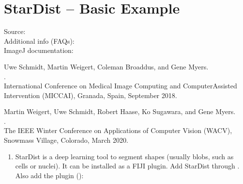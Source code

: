 \documentclass[letterpaper,10pt,english]{jupyterBook}
\begin{document}
\sphinxAtStartPar
{}

\sphinxstepscope


\chapter{StarDist – Basic Example}
\label{\detokenize{stardist:stardist-basic-example}}\label{\detokenize{stardist::doc}}
\sphinxAtStartPar
Source: \\
Additional info (FAQs): \\
ImageJ documentation: 

\sphinxAtStartPar
Uwe Schmidt, Martin Weigert, Coleman Broaddus, and Gene Myers.\\
.\\
International Conference on Medical Image Computing and Computer\sphinxhyphen{}Assisted Intervention (MICCAI), Granada, Spain, September 2018.

\sphinxAtStartPar
Martin Weigert, Uwe Schmidt, Robert Haase, Ko Sugawara, and Gene Myers.\\
.\\
The IEEE Winter Conference on Applications of Computer Vision (WACV), Snowmass Village, Colorado, March 2020.
\begin{enumerate}
%
\item {} 
\sphinxAtStartPar
StarDist is a deep learning tool to segment  shapes (usually blobs, such as cells or nuclei). It can be installed as a FIJI plugin. Add StarDist through . Also add the  plugin ():

\end{enumerate}
\end{document}
